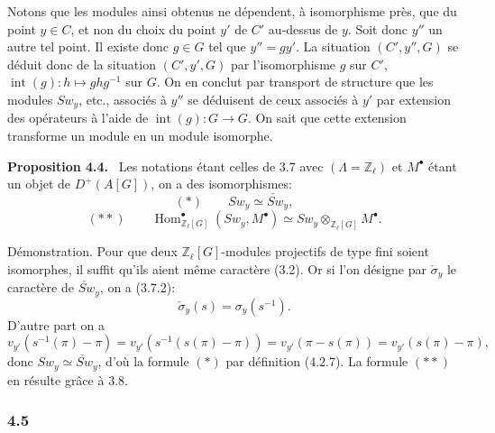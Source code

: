\documentclass[11pt]{article}
\newenvironment{statement}[1]{\par\medskip\noindent\textbf{#1.}\ }{\par\medskip}
\DeclareMathOperator{\Hom}{Hom}
\providecommand{\Hom}{\operatorname{Hom}}
\begin{document}
Notons que les modules ainsi obtenus ne dépendent, à isomorphisme près, que du point $y\in C$, et non du choix du point $y'$ de $C'$ au-dessus de $y$. Soit donc $y''$ un autre tel point. Il existe donc $g\in G$ tel que $y''=g y'$. La situation $(C',y'',G)$ se déduit donc de la situation $(C',y',G)$ par l'isomorphisme $g$ sur $C'$, $\operatorname{int}(g):h\mapsto ghg^{-1}$ sur $G$. On en conclut par transport de structure que les modules $Sw_y$, etc., associés à $y''$ se déduisent de ceux associés à $y'$ par extension des opérateurs à l'aide de $\operatorname{int}(g):G\to G$. On sait que cette extension transforme un module en un module isomorphe.

\begin{statement}{Proposition 4.4}
Les notations étant celles de 3.7 avec $(\Lambda=\mathbb Z_\ell)$ et $M^\bullet$ étant un objet de $D^+(A[G])$, on a des isomorphismes:
\[
(*)\qquad Sw_y\simeq \check{Sw}_y,
\]
\[
(**)\qquad
\Hom^\bullet_{\mathbb Z_\ell[G]}(Sw_y,M^\bullet)
\simeq Sw_y\otimes_{\mathbb Z_\ell[G]}M^\bullet.
\]
\end{statement}

Démonstration. Pour que deux $\mathbb Z_\ell[G]$-modules projectifs de type fini soient isomorphes, il suffit qu'ils aient même caractère (3.2). Or si l'on désigne par $\check\sigma_y$ le caractère de $\check{Sw}_y$, on a (3.7.2):
\[
\check\sigma_y(s)=\sigma_y(s^{-1}).
\]
D'autre part on a
\[
v_{y'}(s^{-1}(\pi)-\pi)
=v_{y'}(s^{-1}(s(\pi)-\pi))
=v_{y'}(\pi-s(\pi))
=v_{y'}(s(\pi)-\pi),
\]
donc $Sw_y\simeq\check{Sw}_y$, d'où la formule $(*)$ par définition (4.2.7). La formule $(**)$ en résulte grâce à 3.8.

\subsubsection*{4.5}
\end{document}
